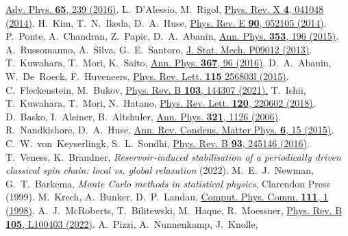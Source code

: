 \documentclass[prl,aps,twocolumn,notitlepage,10pt]{revtex4-1}
\begin{document}
\begin{references}
  \href{https://doi.org/10.1080/00018732.2016.1198134}{Adv.  Phys. {\bf 65}, 239 (2016)}.
  L.~D’Alessio, M.~Rigol,
  \href{https://doi.org/10.1103/PhysRevX.4.041048}{Phys. Rev. X {\bf 4}, 041048 (2014)}.
  H.~Kim, T.~N.~Ikeda, D.~A.~Huse,
  \href{https://doi.org/10.1103/PhysRevE.90.052105}{Phys. Rev. E {\bf 90}, 052105 (2014)}.
  P.~Ponte, A.~Chandran, Z.~Papic, D.~A.~Abanin,
  \href{https://doi.org/10.1016/j.aop.2014.11.008}{Ann. Phys. {\bf 353}, 196 (2015)}.
  A.~Russomanno, A.~Silva, G.~E.~Santoro,
  \href{https://doi.org/10.1088/1742-5468/2013/09/P09012}{J. Stat. Mech. P09012 (2013)}.
  T.~Kuwahara, T.~Mori, K.~Saito,
  \href{https://doi.org/10.1016/j.aop.2016.01.012}{Ann. Phys. {\bf 367}, 96 (2016)}.
  D.~A.~Abanin, W.~De~Roeck, F.~Huveneers,
  \href{https://doi.org/10.1103/PhysRevLett.115.256803}{Phys. Rev. Lett. {\bf 115} 256803l (2015)}.
  C.~Fleckenstein, M.~Bukov,
  \href{https://doi.org/10.1103/PhysRevB.103.144307}{Phys. Rev. B {\bf 103}, 144307 (2021).}
  T.~Ishii, T.~Kuwahara, T.~Mori, N.~Hatano,
  \href{https://doi.org/10.1103/PhysRevLett.120.220602}{Phys. Rev. Lett. {\bf 120}, 220602 (2018)}.
  D.~Basko, I.~Aleiner, B.~Altshuler,
  \href{http://dx.doi.org/10.1016/j.aop.2005.11.014}{Ann. Phys. {\bf 321}, 1126 (2006)}.
  R.~Nandkishore, D.~A.~Huse,
  \href{https://doi.org/10.1146/annurev-conmatphys-031214-014726}{Ann. Rev. Condens. Matter Phys. {\bf 6}, 15 (2015)}.
  C.~W.~von~Keyserlingk, S.~L.~Sondhi,
  \href{https://doi.org/10.1103/PhysRevB.93.245146}{Phys. Rev. B {\bf 93}, 245146 (2016)}.
  T.~Veness, K.~Brandner, \emph{Reservoir-induced stabilisation of a
periodically driven classical spin chain: local vs. global relaxation} (2022).
  M.~E.~J.~Newman, G.~T.~Barkema, \emph{Monte Carlo methods in statistical physics}, Clarendon Press (1999).
  M.~Krech, A.~Bunker, D.~P.~Landau,
  \href{https://doi.org/10.1016/S0010-4655(98)00009-5}{Comput. Phys. Comm. {\bf 111}, 1  (1998)}.
  A.~J.~McRoberts, T.~Bilitewski, M.~Haque, R.~Moessner, 
  \href{https://doi.org/10.1103/PhysRevB.105.L100403}{Phys. Rev. B {\bf 105}, L100403 (2022)}.
  A.~Pizzi, A.~Nunnenkamp, J.~Knolle,

\end{references}
\end{document}
